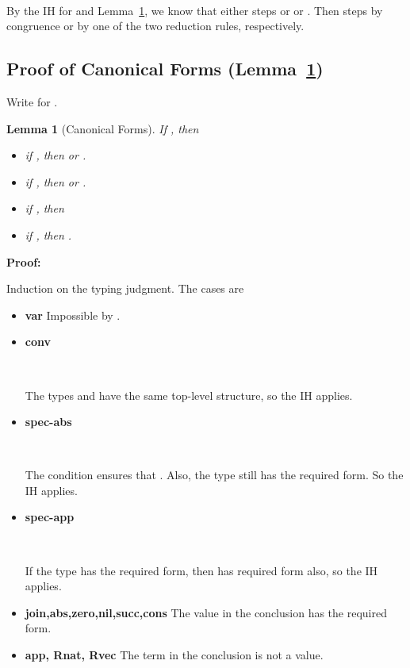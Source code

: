 \documentclass[copyright]{eptcs}
\newtheorem{lemma}{Lemma}
\begin{document}
\ 

\noindent By the IH for  and Lemma~\ref{lem:canonical}, we know that either  steps or  or . Then  steps by congruence or by one of the two reduction rules, respectively.


\subsection{Proof of Canonical Forms (Lemma~\ref{lem:canonical})}
\label{sec:canonical}

Write  for .
\begin{lemma}[Canonical Forms]
\label{lem:canonical}
If , then
\begin{itemize}
\item if , then  or .
\item if , then  or .
\item if , then 
\item if , then .
\end{itemize}
\end{lemma}

\noindent \textbf{Proof:}

Induction on the typing judgment. The cases are 
\begin{itemize}
\item \textbf{var} Impossible by .
\item \textbf{conv}
\



\ 

The types  and  have the same top-level structure, so the IH applies.

\item \textbf{spec-abs}
\



\ 

The condition  ensures that . Also, the type  still has the required form. So the IH applies.

\item \textbf{spec-app}
\



\ 

If the type  has the required form, then  has required form also, so the IH applies.

\item \textbf{join,abs,zero,nil,succ,cons} The value in the conclusion has the required form.
\item \textbf{app, Rnat, Rvec} The term in the conclusion is not a value.

\end{itemize}
\end{document}
